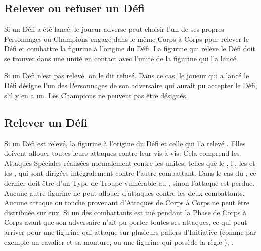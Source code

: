 \subsection{Relever ou refuser un Défi}

Si un Défi a été lancé, le joueur adverse peut choisir l'un de ses propres Personnages ou Champions engagé dans le même Corps à Corps pour relever le Défi et combattre la figurine à l'origine du Défi. La figurine qui relève le Défi doit se trouver dans une unité en contact avec l'unité de la figurine qui l'a lancé.

Si un Défi n'est pas relevé, on le dit refusé. Dans ce cas, le joueur qui a lancé le Défi désigne l'un des Personnages de son adversaire qui aurait pu accepter le Défi, s'il y en a un. Les Champions ne peuvent pas être désignés. 

\subsection{Relever un Défi}
\label{fighting_a_challenge}

Si un Défi est relevé, la figurine à l'origine du Défi et celle qui l'a relevé . Elles doivent allouer toutes leurs attaques contre leur vis-à-vis. Cela comprend les Attaques Spéciales réalisées normalement contre les unités, telles que le \stomp{}, l'\breathweapon{}, les \impacthits{} et les \grindingattacks{}, qui sont dirigées intégralement contre l'autre combattant. Dans le cas du \stomp{}, ce dernier doit être d'un Type de Troupe vulnérable au \stomp{}, sinon l'attaque est perdue. Aucune autre figurine ne peut allouer d'attaques contre les deux combattants. Aucune attaque ou touche provenant d'Attaques de Corps à Corps ne peut être distribuée sur eux. Si un des combattants est tué pendant la Phase de Corps à Corps avant que son adversaire n'ait pu porter toutes ses attaques, ce qui peut arriver pour une figurine qui attaque sur plusieurs paliers d'Initiative (comme par exemple un cavalier et sa monture, ou une figurine qui possède la règle \stomp{}), .

